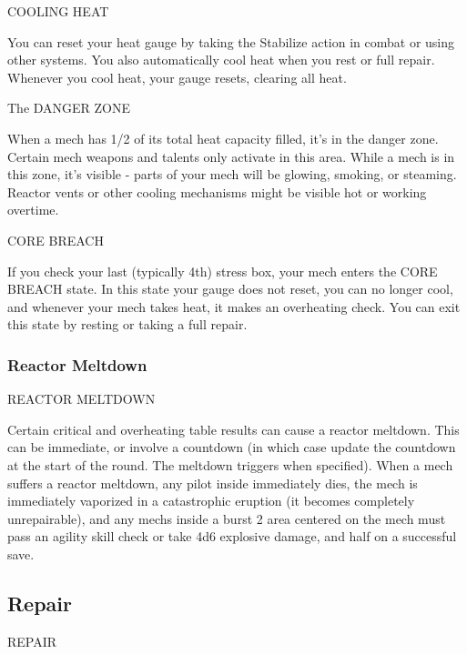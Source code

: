                                                COOLING HEAT  

                                                                                                                


You can reset your heat gauge by taking the Stabilize action in combat or using other systems.  
You also automatically cool heat when you rest or full repair. Whenever you cool heat, your gauge  
resets, clearing all heat. 
 

                                            The DANGER ZONE  

When a mech has 1/2 of its total heat capacity filled, it’s in the danger zone. Certain mech  
weapons and talents only activate in this area. While a mech is in this zone, it’s visible - parts of  
your mech will be glowing, smoking, or steaming. Reactor vents or other cooling mechanisms  
might be visible hot or working overtime.
 

                                              CORE BREACH  

If you check your last (typically 4th) stress box, your mech enters the CORE BREACH state. In  
this state your gauge does not reset, you can no longer cool, and whenever your mech takes  
heat, it makes an overheating check. You can exit this state by resting or taking a full repair.

\subsubsection{Reactor Meltdown}

                                      REACTOR MELTDOWN  

Certain critical and overheating table results can cause a reactor meltdown. This can be  
immediate, or involve a countdown (in which case update the countdown at the start of the  
round. The meltdown triggers when specified). When a mech suffers a reactor meltdown, any  
pilot inside immediately dies, the mech is immediately vaporized in a catastrophic eruption (it  
becomes completely unrepairable), and any mechs inside a burst 2 area centered on the mech  
must pass an agility skill check or take 4d6 explosive damage, and half on a successful save.
 

\subsection{Repair}

                                               REPAIR  

